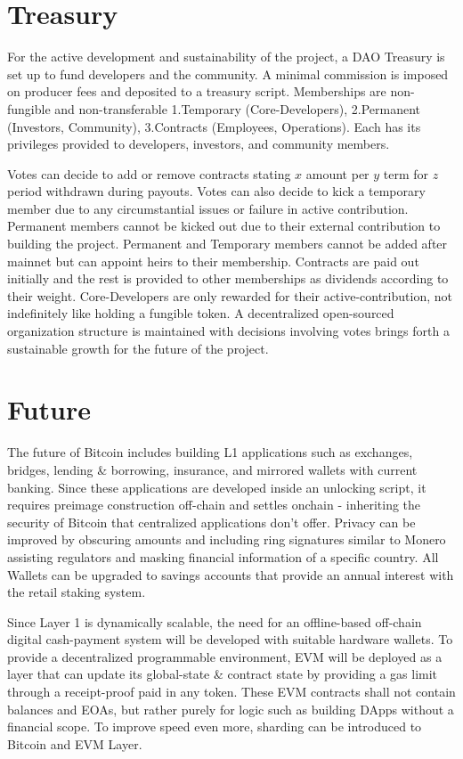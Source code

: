 \documentclass[a4paper,10pt]{article}
\begin{document}
\section{Treasury}
For the active development and sustainability of the project, a DAO Treasury is set up to fund developers and the community. A minimal commission is imposed on producer fees and deposited to a treasury script. Memberships are non-fungible and non-transferable 1.Temporary (Core-Developers), 2.Permanent (Investors, Community), 3.Contracts (Employees, Operations). Each has its privileges provided to developers, investors, and community members. 

Votes can decide to add or remove contracts stating $x$ amount per $y$ term for $z$ period withdrawn during payouts. Votes can also decide to kick a temporary member due to any circumstantial issues or failure in active contribution. Permanent members cannot be kicked out due to their external contribution to building the project. Permanent and Temporary members cannot be added after mainnet but can appoint heirs to their membership. Contracts are paid out initially and the rest is provided to other memberships as dividends according to their weight. Core-Developers are only rewarded for their active-contribution, not indefinitely like holding a fungible token. A decentralized open-sourced organization structure is maintained with decisions involving votes brings forth a sustainable growth for the future of the project. 
\section{Future}

The future of Bitcoin includes building L1 applications such as exchanges, bridges, lending \& borrowing, insurance, and mirrored wallets with current banking. Since these applications are developed inside an unlocking script, it requires preimage construction off-chain and settles onchain - inheriting the security of Bitcoin that centralized applications don't offer. Privacy can be improved by obscuring amounts and including ring signatures similar to Monero assisting regulators and masking financial information of a specific country. All Wallets can be upgraded to savings accounts that provide an annual interest with the retail staking system.

Since Layer 1 is dynamically scalable, the need for an offline-based off-chain digital cash-payment system will be developed with suitable hardware wallets. To provide a decentralized programmable environment, EVM will be deployed as a layer that can update its global-state \& contract state by providing a gas limit through a receipt-proof paid in any token. These EVM contracts shall not contain balances and EOAs, but rather purely for logic such as building DApps without a financial scope. To improve speed even more, sharding can be introduced to Bitcoin and EVM Layer.
\end{document}
